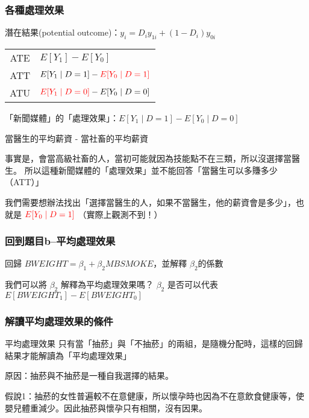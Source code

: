 \begin{frame}
    \frametitle{各種處理效果}
        潛在結果(potential outcome)：$y_i = D_i y_{1i} + (1-D_i) y_{0i}$
    \begin{table}
        \centering
        \begin{tabular}{c | l}
            \hline
            ATE & $E[Y_1] - E[Y_0]$ \\
            ATT & $E[Y_1 \mid D=1] - \begingroup \color{red} E[Y_0 \mid D=1]\endgroup$ \\
            ATU & $\begingroup \color{red}E[Y_1 \mid D=0] \endgroup -  E[Y_0 \mid D=0]$ \\
            \hline
        \end{tabular}
    \end{table}
    \vfill
    「新聞媒體」的「處理效果」：$E[Y_1 \mid D=1] - E[Y_0 \mid D=0]$
    
    當醫生的平均薪資 - 當社畜的平均薪資

    事實是，會當高級社畜的人，當初可能就因為技能點不在三類，所以沒選擇當醫生。
    所以這種新聞媒體的「處理效果」並不能回答「當醫生可以多賺多少（ATT）」
    
    我們需要想辦法找出「選擇當醫生的人，如果不當醫生，他的薪資會是多少」，也就是
    $\begingroup \color{red} E[Y_0 \mid D=1]\endgroup$ （實際上觀測不到！）
\end{frame}

\begin{frame}
    \frametitle{回到題目b--平均處理效果}

    回歸 $BWEIGHT = \beta_1 + \beta_2 MBSMOKE$，並解釋 $\beta_2$的係數

    \begin{alertblock}{我們可以將 $\beta_2$ 解釋為平均處理效果嗎？}
        $\beta_2$ 是否可以代表 $E[BWEIGHT_1] - E[BWEIGHT_0]$
    \end{alertblock}
\end{frame}

\begin{frame}
    \frametitle{解讀平均處理效果的條件}

    \begin{block}{平均處理效果}
        只有當「抽菸」與「不抽菸」的兩組，是隨機分配時，這樣的回歸結果才能解讀為「平均處理效果」
    \end{block}

    原因：抽菸與不抽菸是一種自我選擇的結果。

    假說1：抽菸的女性普遍較不在意健康，所以懷孕時也因為不在意飲食健康等，使嬰兒體重減少。因此抽菸與懷孕只有相關，沒有因果。
\end{frame}


